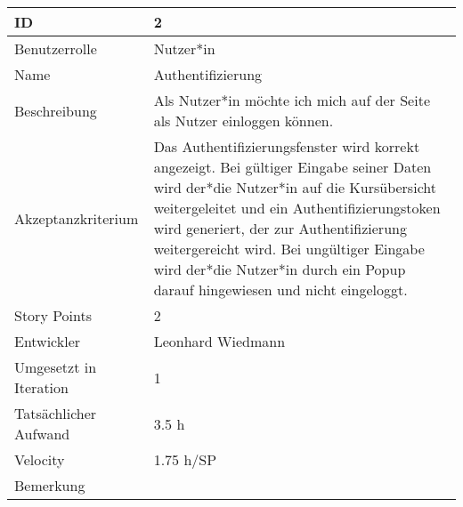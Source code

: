 \begin{tabularx}{\textwidth}{|p{}|X|}
	\hline
	ID & 2\\
	\hline
	Benutzerrolle & Nutzer*in\\
	\hline
	Name & Authentifizierung\\
	\hline
	Beschreibung & Als Nutzer*in möchte ich mich auf der Seite als Nutzer einloggen können.\\
	\hline
	Akzeptanzkriterium & Das Authentifizierungsfenster wird korrekt angezeigt. Bei gültiger Eingabe seiner Daten wird der*die Nutzer*in auf die Kursübersicht weitergeleitet und ein Authentifizierungstoken wird generiert, der zur Authentifizierung weitergereicht wird. Bei ungültiger Eingabe wird der*die Nutzer*in durch ein Popup darauf hingewiesen und nicht eingeloggt.\\
	\hline
	Story Points & 2 \\
	\hline
	Entwickler & Leonhard Wiedmann\\
	\hline
	Umgesetzt in Iteration & 1\\
	\hline
	Tatsächlicher Aufwand & 3.5 h\\
	\hline
	Velocity & 1.75 h/SP\\
	\hline
	Bemerkung & \\
	\hline
\end{tabularx}
\vspace{20pt}
